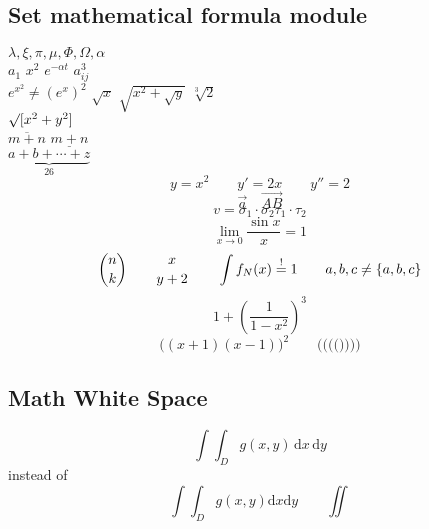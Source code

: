 \documentclass[a4paper,11pt]{article}
\begin{document}
\subsection{Set mathematical formula module}
$\lambda, \xi, \pi, \mu, \Phi, \Omega, \alpha$ \\
$a_{1}$ \qquad $x^{2}$ \qquad
$e^{-\alpha t}$ \qquad
$a^{3}_{ij}$ \\
$e^{x^2} \neq ({e^x})^2 $
$\sqrt{x}$ \qquad
$\sqrt{x^{2}+\sqrt{y}}$
\qquad $\sqrt[3]{2}$\\[3pt]
$\surd[x^2 + y^2]$\\
$\overline{m+n}$ \qquad
$\underline{m+n}$\\
$\underbrace{a+b+\cdots+z}_{26}$\\
\begin{displaymath}
    y=x^2 \qquad y'=2x\qquad y''=2
\end{displaymath}
\begin{displaymath}
    \vec a\quad\overrightarrow{AB}
\end{displaymath}
\begin{displaymath}
    v={\sigma}_1 \cdot {\sigma}_2{\tau}_1\cdot{\tau}_2
\end{displaymath}
\[\lim_{x\to0}\frac{\sin x}{x}=1
    \]
\begin{displaymath}
    {n \choose k} \qquad {x \atop y+2} \qquad
    \int f_N(x) \stackrel{!}{=} 1 \qquad 
    {a,b,c} \neq \{a,b,c\}
\end{displaymath} 
\begin{displaymath}
    1 + \left( \frac{1}{1-x^2}
    \right) ^ 3
\end{displaymath}
\begin{displaymath}
    \Big((x+1)(x-1)\Big) ^ 2 \qquad
    \big(\Big(\bigg(\Bigg(\Bigg)\bigg)\Big)\big)
\end{displaymath}
\subsection{Math White Space}
\newcommand{\ud}{\mathrm{d}}
\begin{displaymath}
    \int\!\!\!\int_{D} g(x,y)
    \, \ud x\, \ud y
\end{displaymath}
instead of
\begin{displaymath}
    \int\int_{D} g(x,y)\ud x\ud y \qquad
    \iint 
\end{displaymath}
\end{document}
